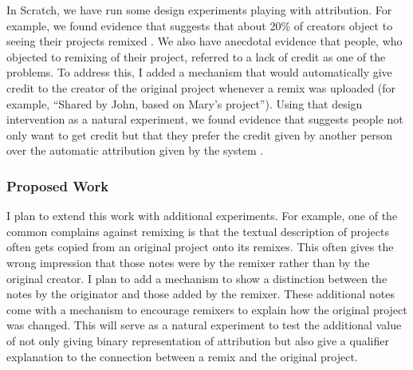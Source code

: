 In Scratch, we have run some design experiments playing with attribution. 
For example, we found evidence that suggests that about 20\% of creators object to seeing their projects remixed \citep{hill_responses_2010}.
We also have anecdotal evidence that people, who objected to remixing of their project, referred to a lack of credit as one of the problems.
To address this, I added a mechanism that would automatically give credit to the creator of the original project whenever a remix was uploaded (for example, ``Shared by John, based on Mary's project'').
Using that design intervention as a natural experiment, we found evidence that suggests people not only want to get credit but that they prefer the credit given by another person over the automatic attribution given by the system \cite{monroy-hernandez_computers_2011}. 

\subsubsection{Proposed Work}
I plan to extend this work with additional experiments.
For example, one of the common complains against remixing is that the textual description of projects often gets copied from an original project onto its remixes.
This often gives the wrong impression that those notes were by the remixer rather than by the original creator.
I plan to add a mechanism to show a distinction between the notes by the originator and those added by the remixer.
These additional notes come with a mechanism to encourage remixers to explain how the original project was changed.
This will serve as a natural experiment to test the additional value of not only giving binary representation of attribution but also give a qualifier explanation to the connection between a remix and the original project.


